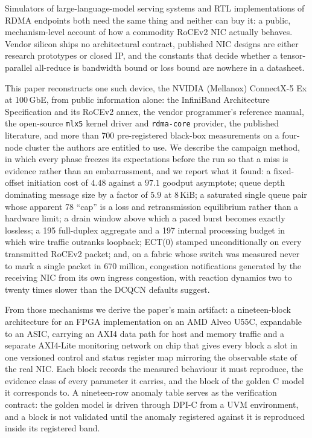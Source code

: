 Simulators of large-language-model serving systems and RTL implementations of
RDMA endpoints both need the same thing and neither can buy it: a public,
mechanism-level account of how a commodity RoCEv2 NIC actually behaves. Vendor
silicon ships no architectural contract, published NIC designs are either
research prototypes or closed IP, and the constants that decide whether a
tensor-parallel all-reduce is bandwidth bound or loss bound are nowhere in a
datasheet.

This paper reconstructs one such device, the NVIDIA (Mellanox) ConnectX-5 Ex at
100\,GbE, from public information alone: the InfiniBand Architecture
Specification and its RoCEv2 annex, the vendor programmer's reference manual,
the open-source \texttt{mlx5} kernel driver and \texttt{rdma-core} provider,
the published literature, and more than 700 pre-registered black-box
measurements on a four-node cluster the authors are entitled to use. We
describe the campaign method, in which every phase freezes its expectations
before the run so that a miss is evidence rather than an embarrassment, and we
report what it found: a fixed-offset initiation cost of $4.48$\uS{} against a
$97.1$\Gbps{} goodput asymptote; queue depth dominating message size by a
factor of $5.9$ at 8\,KiB; a saturated single queue pair whose apparent
78\Gbps{} ``cap'' is a loss and retransmission equilibrium rather than a
hardware limit; a drain window above which a paced burst becomes exactly
lossless; a 195\Gbps{} full-duplex aggregate and a 197\Gbps{} internal
processing budget in which wire traffic outranks loopback; ECT(0) stamped
unconditionally on every transmitted RoCEv2 packet; and, on a fabric whose
switch was measured never to mark a single packet in 670 million, congestion
notifications generated by the receiving NIC from its own ingress congestion,
with reaction dynamics two to twenty times slower than the DCQCN defaults
suggest.

From those mechanisms we derive the paper's main artifact: a nineteen-block
architecture for an FPGA implementation on an AMD Alveo U55C, expandable to an
ASIC, carrying an AXI4 data path for host and memory traffic and a separate
AXI4-Lite monitoring network on chip that gives every block a slot in one
versioned control and status register map mirroring the observable state of the
real NIC. Each block records the measured behaviour it must reproduce, the
evidence class of every parameter it carries, and the block of the golden C
model it corresponds to. A nineteen-row anomaly table serves as the
verification contract: the golden model is driven through DPI-C from a UVM
environment, and a block is not validated until the anomaly registered against
it is reproduced inside its registered band.
